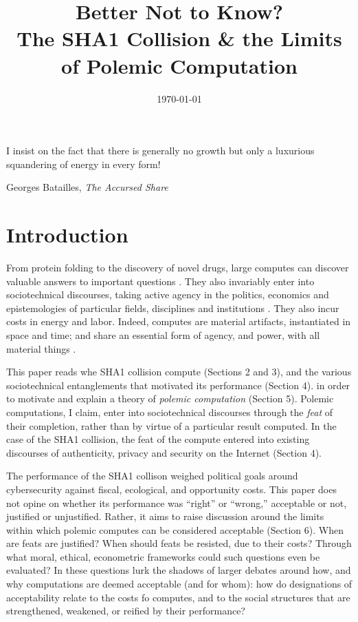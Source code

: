 \documentclass[sigconf]{acmart}
\date{\today}
\title{Better Not to Know?\\\medskip
\large The SHA1 Collision \& the Limits of Polemic Computation}
\begin{document}
\maketitle

\epigraph{I insist on the fact that there is generally no growth but only a luxurious squandering of energy in every form!}{Georges Batailles, \textit{The Accursed Share}}


\section{Introduction}
\label{sec:orgb977a0b}

From protein folding to the discovery of novel drugs,
large computes can discover valuable answers to important questions
\cite{Anderson2004}.
They also invariably enter into sociotechnical discourses,
taking active agency in the politics, economics and epistemologies 
of particular fields, disciplines and institutions \cite{Ames2015}.
They also incur costs in energy and labor.
Indeed, computes are material artifacts, instantiated in space and time;
and share an essential form of agency, and power, with all material things \cite{Bennett2013a,Winner2003}.

This paper reads whe SHA1 collision compute (Sections 2 and 3), 
and the various sociotechnical entanglements that motivated its performance (Section 4).
in order to motivate and explain a theory of \emph{polemic computation} (Section 5).
Polemic computations, I claim, enter into sociotechnical discourses through the \emph{feat} of their completion, rather than by virtue of a particular result computed.
In the case of the SHA1 collision, the feat of the compute entered into existing discourses of authenticity, privacy and security on the Internet (Section 4).

The performance of the SHA1 collison weighed political goals around cybersecurity against fiscal, ecological, and opportunity costs.
This paper does not opine on whether its performance was ``right'' or ``wrong,'' acceptable or not, justified or unjustified.
Rather, it aims to raise discussion around the limits within which polemic computes can be considered acceptable (Section 6).
When are feats are justified? 
When should feats be resisted, due to their costs? 
Through what moral, ethical, econometric frameworks could such questions even be evaluated? 
In these questions lurk the shadows of larger debates around how, and why computations are deemed acceptable (and for whom):
how do designations of acceptability relate to the costs fo computes, and to the social structures that are strengthened, weakened, or reified by their performance?
\end{document}
